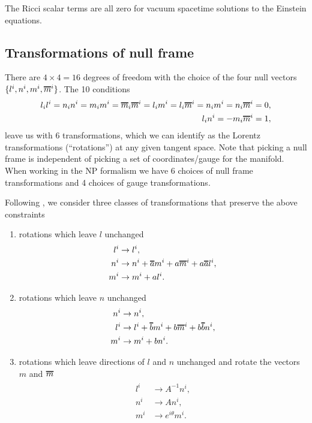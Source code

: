 \documentclass[12pt]{report}
\newcommand*\oline[1]{%
   \vbox{%
     \hrule height 1pt%
     \kern0.25ex%
     \hbox{%
       \ifmmode#1\else\ensuremath{#1}\fi%
     }
   }
}
\begin{document}
	The Ricci scalar terms are
all zero for vacuum spacetime solutions to the Einstein equations.
\subsection{Transformations of null frame}
	There are $4\times4=16$ degrees of freedom with the choice
of the four null vectors $\{l^i,n^i,m^i,\oline{m}^i\}$. The 10 conditions
\begin{align}
\begin{aligned}
	l_il^i=n_in^i=m_im^i=\oline{m}_i\oline{m}^i
	=l_im^i=l_i\oline{m}^i=n_im^i=n_i\oline{m}^i
	= 0
	, \\
	l_in^i=-m_i\oline{m}^i=1
	,
\end{aligned}
\end{align} 
	leave us with 6 transformations, which we can identify as the
Lorentz transformations (``rotations'')
at any given tangent space. 
Note that picking a null frame is independent of picking a set
of coordinates/gauge for the manifold. When working in the NP formalism
we have 6 choices of null frame transformations and 4 choices of gauge
transformations.

Following
\cite{Chandrasekhar_bh_book}, we consider three classes of transformations
that preserve the above constraints

\begin{enumerate}[I]
\item rotations which leave $l$ unchanged 
\begin{align}
\begin{aligned}
	l^i & \to l^i , \\
	n^i & \to n^i + \oline{a} m^i + a \oline{m}^i + a \oline{a} l^i  , \\
	m^i & \to m^i + a l^i
	.
\end{aligned}
\end{align}
\item rotations which leave $n$ unchanged 
\begin{align}
\begin{aligned}
	n^i & \to n^i , \\
	l^i & \to l^i + \oline{b} m^i + b \oline{m}^i + b \oline{b} n^i  , \\
	m^i & \to m^i + b n^i
	.
\end{aligned}
\end{align}
\item rotations which leave directions of $l$ and $n$ unchanged and rotate
the vectors $m$ and $\oline{m}$ 
\begin{align}
\begin{aligned}
	l^i & \to A^{-1} n^i , \\
	n^i & \to A n^i , \\
	m^i & \to e^{i\theta} m^i
	.
\end{aligned}
\end{align}
\end{enumerate}
\end{document}
